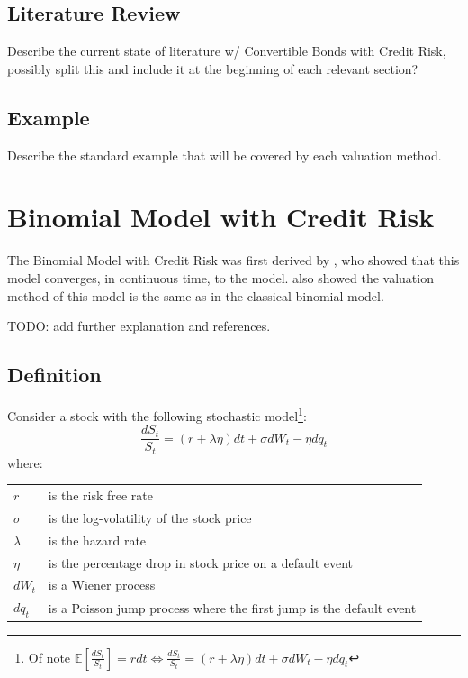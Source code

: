 \documentclass[a4paper,11pt,oneside]{report}
\theoremstyle{plain}
\theoremstyle{definition}
\def\S{\ensuremath{S_t}\xspace}
\def\dS{\ensuremath{dS_t}\xspace}
\def\dt{\ensuremath{dt}\xspace}
\def\dW{\ensuremath{dW_t}\xspace}
\def\dq{\ensuremath{dq_t}\xspace}
\begin{document}
\section{Literature Review}
Describe the current state of literature w/ Convertible Bonds with Credit Risk,
possibly split this and include it at the beginning of each relevant section?

\section{Example}
Describe the standard example that will be covered by each valuation method.

\chapter{Binomial Model with Credit Risk}
The Binomial Model with Credit Risk was first derived by \citet{MK12}, who showed that this model converges, in continuous time, to the \citet{AFV03} model.   also showed the valuation method of this model is the same as in the classical binomial model.

TODO: add further explanation and references.

\section{Definition}
Consider a stock with the following stochastic model\footnote{Of note $\mathbb{E}[\frac{\dS}{\S}] = r\dt \Leftrightarrow \frac{\dS}{\S} = (r + \lambda\eta)\dt + \sigma\dW - \eta\dq$}:
\begin{equation}
 \frac{\dS}{\S} = (r + \lambda\eta)\dt + \sigma\dW - \eta\dq
\end{equation}
where:

\begin{tabular}{ll}
 $r$            & is the risk free rate \\
 $\sigma$       & is the log-volatility of the stock price \\
 $\lambda$      & is the hazard rate \\
 $\eta$         & is the percentage drop in stock price on a default event \\
 \dW            & is a Wiener process \\
 \dq            & is a Poisson jump process where the first jump is the default event \\
\end{tabular}
\end{document}
